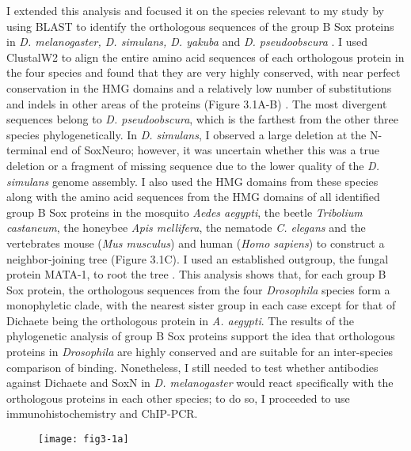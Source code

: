I extended this analysis and focused it on the species relevant to my study by using BLAST to identify the orthologous sequences of the group B Sox proteins in \emph{D. melanogaster, D. simulans, D. yakuba} and \emph{D. pseudoobscura} \citep{altschul_basic_1990}. I used ClustalW2 to align the entire amino acid sequences of each orthologous protein in the four species and found that they are very highly conserved, with near perfect conservation in the HMG domains and a relatively low number of substitutions and indels in other areas of the proteins (Figure 3.1A-B) \citep{chenna_multiple_2003}. The most divergent sequences belong to \emph{D. pseudoobscura}, which is the farthest from the other three species phylogenetically. In \emph{D. simulans}, I observed a large deletion at the N-terminal end of SoxNeuro; however, it was uncertain whether this was a true deletion or a fragment of missing sequence due to the lower quality of the \emph{D. simulans} genome assembly. I also used the HMG domains from these species along with the amino acid sequences from the HMG domains of all identified group B Sox proteins in the mosquito \emph{Aedes aegypti}, the beetle \emph{Tribolium castaneum}, the honeybee \emph{Apis mellifera}, the nematode \emph{C. elegans} and the vertebrates mouse (\emph{Mus musculus}) and human (\emph{Homo sapiens}) to construct a neighbor-joining tree (Figure 3.1C). I used an established outgroup, the fungal protein MATA-1, to root the tree \citep{laudet_ancestry_1993}. This analysis shows that, for each group B Sox protein, the orthologous sequences from the four \emph{Drosophila} species form a monophyletic clade, with the nearest sister group in each case except for that of Dichaete being the orthologous protein in \emph{A. aegypti}. The results of the phylogenetic analysis of group B Sox proteins support the idea that orthologous proteins in \emph{Drosophila} are highly conserved and are suitable for an inter-species comparison of binding. Nonetheless, I still needed to test whether antibodies against Dichaete and SoxN in \emph{D. melanogaster} would react specifically with the orthologous proteins in each other species; to do so, I proceeded to use immunohistochemistry and ChIP-PCR.

\begin{figure}[H]
\centering
\texttt{[image: fig3-1a]}
\label{Figure 3.1}
\end{figure}

